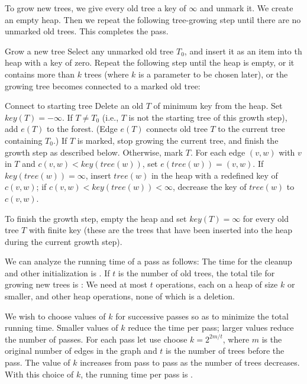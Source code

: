 To grow new trees, we give every old tree a key of \(\infty\) and unmark it. We
create an empty heap. Then we repeat the following tree-growing step until there are
no unmarked old trees. This completes the pass.

\begin{step}{Grow a new tree}
    Select any unmarked old tree \(T_0\), and insert it as an item into th heap with
    a key of zero. Repeat the following step until the heap is empty, or it contains
    more than \(k\) trees (where \(k\) is a parameter to be chosen later), or the
    growing tree becomes connected to a marked old tree:

    \begin{step}{Connect to starting tree}
        Delete an old \(T\) of minimum key from the heap. Set \(key(T) = -\infty\).
        If \(T \neq T_0\) (i.e., \(T\) is not the starting tree of this growth step),
        add \(e(T)\) to the forest. (Edge \(e(T)\) connects old tree \(T\) to the
        current tree containing \(T_0\).) If \(T\) is marked, stop growing the
        current tree, and finish the growth step as described below. Otherwise, mark
        \(T\). For each edge \((v, w)\) with \(v\) in \(T\) and \(c(v, w)
        < key(tree(w))\), set \(e(tree(w)) = (v, w)\). If \(key(tree(w)) = \infty\),
        insert \(tree(w)\) in the heap with a redefined key of \(c(v, w)\); if \(c(v,
        w) < key(tree(w)) < \infty\), decrease the key of \(tree(w)\) to \(c(v, w)\).
    \end{step}

    To finish the growth step, empty the heap and set \(key(T) = \infty\) for every
    old tree \(T\) with finite key (these are the trees that have been inserted into
    the heap during the current growth step).
\end{step}

We can analyze the running time of a pass as follows: The time for the cleanup and
other initialization is . If \(t\) is the number of old trees, the total tile
for growing new trees is : We need at most \(t\) 
operations, each on a heap of size \(k\) or smaller, and  other heap
operations, none of which is a deletion.

We wish to choose values of \(k\) for successive passes so as to minimize the total
running time. Smaller values of \(k\) reduce the time per pass; larger values reduce
the number of passes. For each pass let use choose \(k = 2^{2m/t}\), where \(m\) is
the original number of edges in the graph and \(t\) is the number of trees before the
pass. The value of \(k\) increases from pass to pass as the number of trees
decreases. With this choice of \(k\), the running time per pass is .

